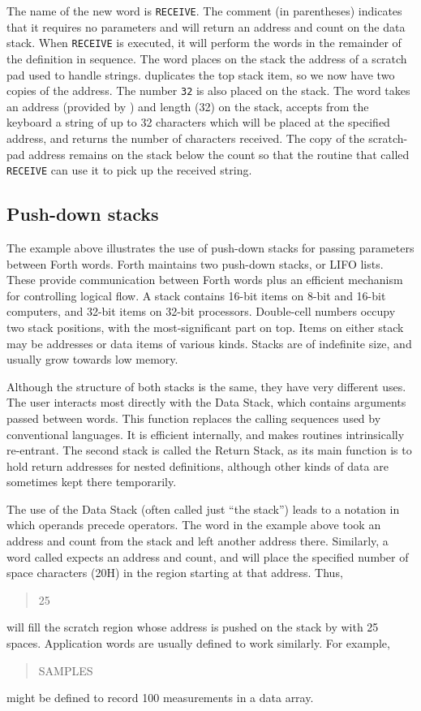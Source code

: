 The name of the new word is \texttt{RECEIVE}. The comment (in
parentheses) indicates that it requires no parameters and will
return an address and count on the data stack. When \texttt{RECEIVE}
is executed, it will perform the words in the remainder of the
definition in sequence. The word  places on the stack the
address of a scratch pad used to handle strings.  duplicates
the top stack item, so we now have two copies of the address. The
number \texttt{32} is also placed on the stack. The word
 takes an address (provided by ) and length
(32) on the stack, accepts from the keyboard a string of up to 32
characters which will be placed at the specified address, and returns
the number of characters received. The copy of the scratch-pad address
remains on the stack below the count so that the routine that called
\texttt{RECEIVE} can use it to pick up the received string.

\subsection{Push-down stacks} %

The example above illustrates the use of push-down stacks for passing
parameters between Forth words. Forth maintains two push-down stacks,
or LIFO lists. These provide communication between Forth words plus
an efficient mechanism for controlling logical flow. A stack contains
16-bit items on 8-bit and 16-bit computers, and 32-bit items on 32-bit
processors. Double-cell numbers occupy two stack positions, with the
most-significant part on top. Items on either stack may be addresses
or data items of various kinds. Stacks are of indefinite size, and
usually grow towards low memory.

Although the structure of both stacks is the same, they have very
different uses. The user interacts most directly with the Data Stack,
which contains arguments passed between words. This function replaces
the calling sequences used by conventional languages. It is efficient
internally, and makes routines intrinsically re-entrant. The second
stack is called the Return Stack, as its main function is to hold
return addresses for nested definitions, although other kinds of data
are sometimes kept there temporarily.

The use of the Data Stack (often called just ``the stack'') leads to
a notation in which operands precede operators. The word 
in the example above took an address and count from the stack and left
another address there. Similarly, a word called 
expects an address and count, and will place the specified number of
space characters (20H) in the region starting at that address. Thus,
\begin{quote}\ttfamily
	 25 
\end{quote}
will fill the scratch region whose address is pushed on the stack
by  with 25 spaces. Application words are usually defined
to work similarly. For example,
\begin{quote} SAMPLES
\end{quote}
might be defined to record 100 measurements in a data array.

